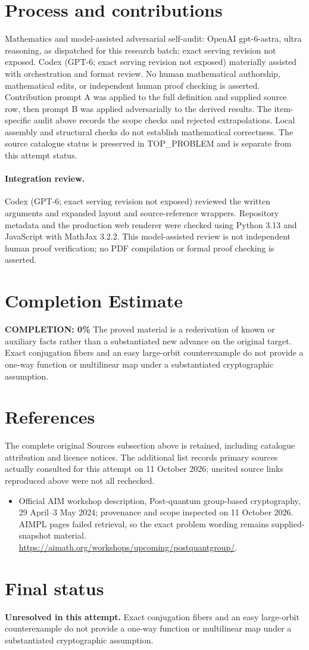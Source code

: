 \documentclass[11pt]{article}
\begin{document}
\section{Process and contributions}
Mathematics and model-assisted adversarial self-audit: OpenAI gpt-6-astra, ultra reasoning, as dispatched for this research batch; exact serving revision not exposed. Codex (GPT-6; exact serving revision not exposed) materially assisted with orchestration and format review. No human mathematical authorship, mathematical edits, or independent human proof checking is asserted.
Contribution prompt A was applied to the full definition and supplied source row, then prompt B was applied adversarially to the derived results. The item-specific audit above records the scope checks and rejected extrapolations. Local assembly and structural checks do not establish mathematical correctness. The source catalogue status is preserved in TOP\_PROBLEM and is separate from this attempt status.
\paragraph{Integration review.} Codex (GPT-6; exact serving revision not exposed) reviewed the written arguments and expanded layout and source-reference wrappers. Repository metadata and the production web renderer were checked using Python 3.13 and JavaScript with MathJax 3.2.2. This model-assisted review is not independent human proof verification; no PDF compilation or formal proof checking is asserted.

\section{Completion Estimate}
\noindent\textbf{COMPLETION: 0\%}
The proved material is a rederivation of known or auxiliary facts rather than a substantiated new advance on the original target. Exact conjugation fibers and an easy large-orbit counterexample do not provide a one-way function or multilinear map under a substantiated cryptographic assumption.
\section{References}
The complete original Sources subsection above is retained, including catalogue attribution and licence notices. The additional list records primary sources actually consulted for this attempt on 11 October 2026; uncited source links reproduced above were not all rechecked.
\begin{itemize}
\item Official AIM workshop description, Post-quantum group-based cryptography, 29 April--3 May 2024; provenance and scope inspected on 11 October 2026. AIMPL pages failed retrieval, so the exact problem wording remains supplied-snapshot material. \url{https://aimath.org/workshops/upcoming/postquantgroup/}.
\end{itemize}
\section{Final status}
\textbf{Unresolved in this attempt.} Exact conjugation fibers and an easy large-orbit counterexample do not provide a one-way function or multilinear map under a substantiated cryptographic assumption.
\end{document}
